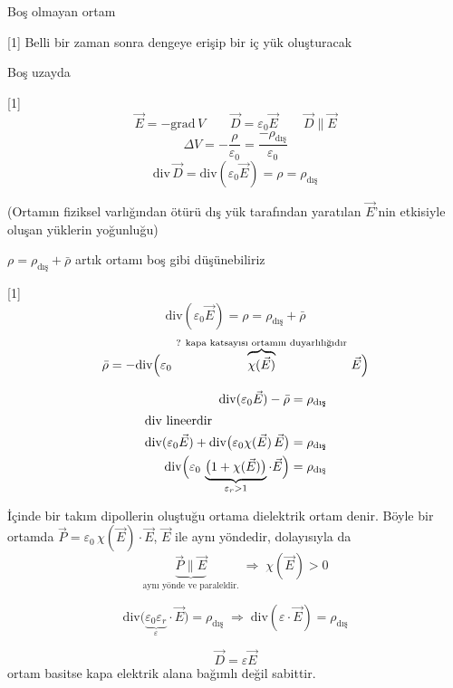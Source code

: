 \documentclass[11pt,a4paper]{article}
\begin{document}

Boş olmayan ortam

[1]
Belli bir zaman sonra dengeye erişip bir iç yük oluşturacak

Boş uzayda

[1]
\[ \vec E = -\mathrm{grad}\,V \qquad \vec D = \varepsilon_0\vec E \qquad \vec D\parallel\vec E \]
\[ \Delta V = -\frac{\rho}{\varepsilon_0} = \frac{-\rho_{\text{dış}}}{\varepsilon_0} \]
\[ \mathrm{div}\,\vec D = \mathrm{div}(\varepsilon_0\vec E) = \rho = \rho_{\text{dış}} \]

(Ortamın fiziksel varlığından ötürü dış yük tarafından yaratılan $\vec E$'nin etkisiyle oluşan yüklerin yoğunluğu)

$\rho = \rho_{\text{dış}} + \bar\rho$ \qquad artık ortamı boş gibi düşünebiliriz

[1]
\[ \mathrm{div}(\varepsilon_0\vec E) = \rho = \rho_{\text{dış}} + \bar\rho \]
\[ \bar\rho = -\mathrm{div}\Bigl(\varepsilon_0\,\overbrace{\chi(\vec E)}^{\text{? kapa katsayısı ortamın duyarlılığıdır}}\,\vec E\Bigr) \]

\begin{align*}
\mathrm{div}(\varepsilon_0\vec E) - \bar\rho &= \rho_{\text{dış}} \\
\intertext{div lineerdir}
\mathrm{div}(\varepsilon_0\vec E) + \mathrm{div}\bigl(\varepsilon_0\chi(\vec E)\,\vec E\bigr) &= \rho_{\text{dış}} \\
\mathrm{div}\Bigl(\varepsilon_0\,\underbrace{\bigl(1+\chi(\vec E)\bigr)}_{\varepsilon_r>1}\cdot\vec E\Bigr) &= \rho_{\text{dış}}
\end{align*}

İçinde bir takım dipollerin oluştuğu ortama dielektrik ortam denir. Böyle bir ortamda $\vec P = \varepsilon_0\,\chi(\vec E)\cdot\vec E$, $\vec E$ ile aynı yöndedir, dolayısıyla da
\[ \underbrace{\vec P \parallel \vec E}_{\text{aynı yönde ve paraleldir.}} \;\Rightarrow\; \chi(\vec E) > 0 \]

\[ \mathrm{div}\bigl(\underbrace{\varepsilon_0\varepsilon_r}_{\varepsilon}\cdot\vec E\bigr) = \rho_{\text{dış}} \;\Rightarrow\; \mathrm{div}(\varepsilon\cdot\vec E) = \rho_{\text{dış}} \]

\[ \vec D = \varepsilon\vec E \]
ortam basitse kapa elektrik alana bağımlı değil sabittir.
\end{document}
